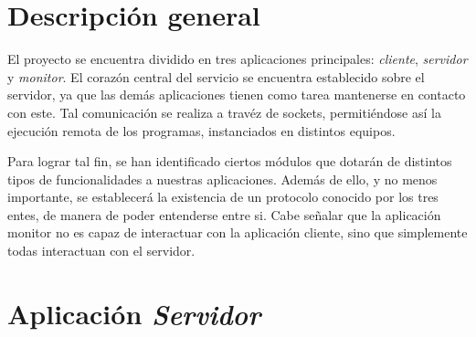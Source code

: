 \documentclass{article}
\begin{document}
\section{Descripción general}

	El proyecto se encuentra dividido en tres aplicaciones principales: \textit{cliente}, \textit{servidor} y \textit{monitor}. El corazón central del servicio se encuentra establecido sobre el servidor, ya que las demás aplicaciones tienen como tarea mantenerse en contacto con este. Tal comunicación se realiza a travéz de sockets, permitiéndose así la ejecución remota de los programas, instanciados en distintos equipos.
	\par
	Para lograr tal fin, se han identificado ciertos módulos que dotarán de distintos tipos de funcionalidades a nuestras aplicaciones. Además de ello, y no menos importante, se establecerá la existencia de un protocolo conocido por los tres entes, de manera de poder entenderse entre si. Cabe señalar que la aplicación monitor no es capaz de interactuar con la aplicación cliente, sino que simplemente todas interactuan con el servidor.
\bigskip




\section{Aplicación \textit{Servidor}}
\end{document}

